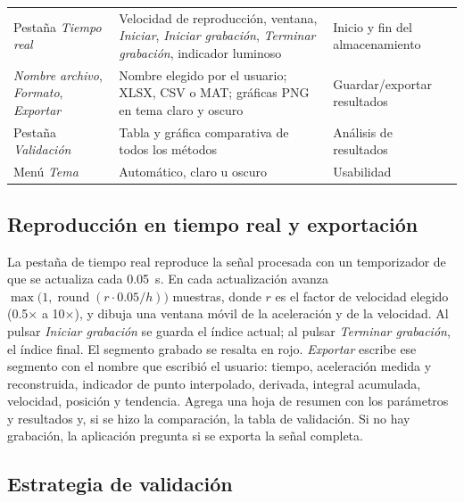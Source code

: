 \begin{longtable}{@{}p{3.8cm}p{6.6cm}p{3.6cm}@{}}
Pestaña \textit{Tiempo real} & Velocidad de reproducción, ventana, \textit{Iniciar}, \textit{Iniciar grabación}, \textit{Terminar grabación}, indicador luminoso & Inicio y fin del almacenamiento \\
\textit{Nombre archivo}, \textit{Formato}, \textit{Exportar} & Nombre elegido por el usuario; XLSX, CSV o MAT; gráficas PNG en tema claro y oscuro & Guardar/exportar resultados \\
Pestaña \textit{Validación} & Tabla y gráfica comparativa de todos los métodos & Análisis de resultados \\
Menú \textit{Tema} & Automático, claro u oscuro \parencite{mathworks_theme} & Usabilidad \\
\end{longtable}

\subsection{Reproducción en tiempo real y exportación}

La pestaña de tiempo real reproduce la señal procesada con un temporizador de \matlab{} que se actualiza cada 0.05~s. En cada actualización avanza $\max\bigl(1, \operatorname{round}(r \cdot 0.05/h)\bigr)$ muestras, donde $r$ es el factor de velocidad elegido (0.5$\times$ a 10$\times$), y dibuja una ventana móvil de la aceleración y de la velocidad. Al pulsar \textit{Iniciar grabación} se guarda el índice actual; al pulsar \textit{Terminar grabación}, el índice final. El segmento grabado se resalta en rojo. \textit{Exportar} escribe ese segmento con el nombre que escribió el usuario: tiempo, aceleración medida y reconstruida, indicador de punto interpolado, derivada, integral acumulada, velocidad, posición y tendencia. Agrega una hoja de resumen con los parámetros y resultados y, si se hizo la comparación, la tabla de validación. Si no hay grabación, la aplicación pregunta si se exporta la señal completa.

\subsection{Estrategia de validación}

